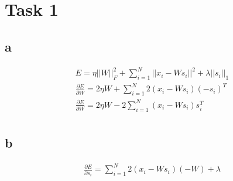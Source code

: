 \section*{Task 1}

\subsection*{a}

\begin{gather*}
E = \eta ||W||^2_F + \sum^N_{i=1} ||x_i - W s_i||^2 + \lambda ||s_i||_1 \\
\frac{\partial E}{\partial W} = 2 \eta W + \sum^N_{i=1} 2(x_i - W s_i) (- s_i)^T \\
\frac{\partial E}{\partial W} = 2 \eta W  -2\sum^N_{i=1} (x_i - W s_i) s_i^T \\
\end{gather*}

\subsection*{b}

\begin{gather*}
\frac{\partial E}{\partial s_i} = \sum^N_{i=1} 2(x_i - W s_i) (-W) + \lambda \\
\end{gather*}

